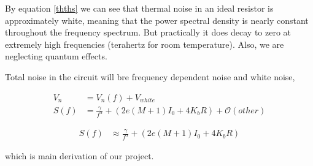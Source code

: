 By equation \ref{thths} we can see that thermal noise in an ideal resistor is approximately white, meaning that the power spectral density is nearly constant throughout the frequency spectrum. But practically it does decay to zero at extremely high frequencies (terahertz for room temperature). Also, we are neglecting quantum effects. 


Total noise in the circuit will bre frequency dependent noise and white noise,


\begin{align*}
V_n & = V_{n}(f)+ V_{white}\\
S(f) & = \frac{\gamma}{f^{\alpha}}+(2e(M+1)I_0+4K_bR)+\mathcal{O}(other)
\end{align*}

\begin{align}\label{theoryvn}
S(f) & \approx \frac{\gamma}{f^{\alpha}}+(2e(M+1)I_0+4K_bR)
\end{align}

which is main derivation of our project.

